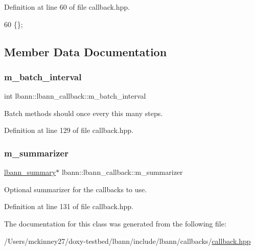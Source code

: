 Definition at line 60 of file callback.\+hpp.


\begin{DoxyCode}
60 \{\};
\end{DoxyCode}


\subsection{Member Data Documentation}
\mbox{\label{classlbann_1_1lbann__callback_a6126e310e9924398c18ccf76bb91c705}} 
\subsubsection{\texorpdfstring{m\+\_\+batch\+\_\+interval}{m\_batch\_interval}}
{\footnotesize\ttfamily int lbann\+::lbann\+\_\+callback\+::m\+\_\+batch\+\_\+interval\hspace{0.3cm}{\ttfamily [protected]}}

Batch methods should once every this many steps. 

Definition at line 129 of file callback.\+hpp.

\mbox{\label{classlbann_1_1lbann__callback_a277d46138184f85f161a8263b8322c76}} 
\subsubsection{\texorpdfstring{m\+\_\+summarizer}{m\_summarizer}}
{\footnotesize\ttfamily \hyperlink{classlbann_1_1lbann__summary}{lbann\+\_\+summary}$\ast$ lbann\+::lbann\+\_\+callback\+::m\+\_\+summarizer\hspace{0.3cm}{\ttfamily [protected]}}

Optional summarizer for the callbacks to use. 

Definition at line 131 of file callback.\+hpp.



The documentation for this class was generated from the following file\+:\begin{DoxyCompactItemize}
\item 
/\+Users/mckinney27/doxy-\/testbed/lbann/include/lbann/callbacks/\hyperlink{callback_8hpp}{callback.\+hpp}\end{DoxyCompactItemize}
